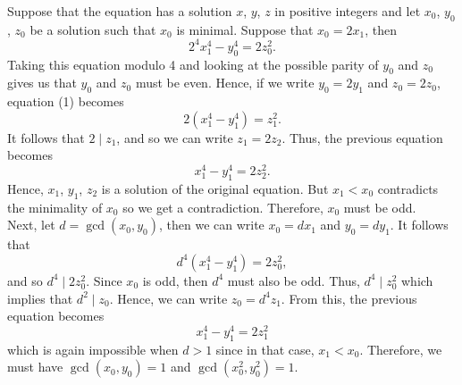 \begin{solution}
    Suppose that the equation has a solution $x$, $y$, $z$ in positive integers and let $x_0$, $y_0$, $z_0$ be a solution such that $x_0$ is minimal. Suppose that $x_0 = 2x_1$, then
    \begin{equation}
        2^4x_1^4 - y_0^4 = 2z_0^2. \tag{1}
    \end{equation}
    Taking this equation modulo 4 and looking at the possible parity of $y_0$ and $z_0$ gives us that $y_0$ and $z_0$ must be even. Hence, if we write $y_0 = 2y_1$ and $z_0 = 2z_0$, equation (1) becomes
    $$2(x_1^4 - y_1^4) = z_1^2.$$
    It follows that $2 \mid z_1$, and so we can write $z_1 = 2z_2$. Thus, the previous equation becomes
    $$x_1^4 - y_1^4 = 2z_2^2.$$
    Hence, $x_1$, $y_1$, $z_2$ is a solution of the original equation. But $x_1 < x_0$ contradicts the minimality of $x_0$ so we get a contradiction. Therefore, $x_0$ must be odd. \\
    
    Next, let $d = \gcd(x_0, y_0)$, then we can write $x_0 = dx_1$ and $y_0 = dy_1$. It follows that 
    $$d^4(x_1^4 - y_1^4) = 2z_0^2,$$
    and so $d^4 \mid 2z_0^2$. Since $x_0$ is odd, then $d^4$ must also be odd. Thus, $d^4 \mid z_0^2$ which implies that $d^2 \mid z_0$. Hence, we can write $z_0 = d^4 z_1$. From this, the previous equation becomes 
    $$x_1^4 - y_1^4 = 2z_1^2$$
    which is again impossible when $d > 1$ since in that case, $x_1 < x_0$. Therefore, we must have $\gcd(x_0, y_0) = 1$ and $\gcd(x_0^2, y_0^2) = 1$. \\
    

\end{solution}
